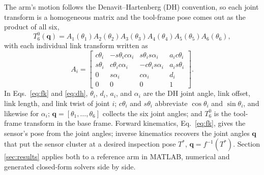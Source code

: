 \documentclass[conference]{IEEEtran}
\begin{document}
The arm's motion follows the Denavit--Hartenberg (DH) convention, so each joint transform is a homogeneous matrix and the tool-frame pose comes out as the product of all six,
\begin{equation}
T_6^0(\mathbf{q}) = A_1(\theta_1)A_2(\theta_2)A_3(\theta_3)A_4(\theta_4)A_5(\theta_5)A_6(\theta_6),
\label{eq:fk}
\end{equation}
with each individual link transform written as
\begin{equation}
A_i = \begin{bmatrix}
c\theta_i & -s\theta_i c\alpha_i & s\theta_i s\alpha_i & a_i c\theta_i \\
s\theta_i & c\theta_i c\alpha_i & -c\theta_i s\alpha_i & a_i s\theta_i \\
0 & s\alpha_i & c\alpha_i & d_i \\
0 & 0 & 0 & 1
\end{bmatrix}.
\label{eq:dh}
\end{equation}
In Eqs.~\eqref{eq:fk} and \eqref{eq:dh}, $\theta_i$, $d_i$, $a_i$, and $\alpha_i$ are the DH joint angle, link offset, link length, and link twist of joint $i$; $c\theta_i$ and $s\theta_i$ abbreviate $\cos\theta_i$ and $\sin\theta_i$, and likewise for $\alpha_i$; $\mathbf{q}=[\theta_1,\ldots,\theta_6]$ collects the six joint angles; and $T_6^0$ is the tool-frame transform in the base frame. Forward kinematics, Eq.~\eqref{eq:fk}, gives the sensor's pose from the joint angles; inverse kinematics recovers the joint angles $\mathbf{q}$ that put the sensor cluster at a desired inspection pose $T^*$, $\mathbf{q} = f^{-1}(T^*)$. Section \ref{sec:results} applies both to a reference arm in MATLAB, numerical and generated closed-form solvers side by side.
\end{document}
